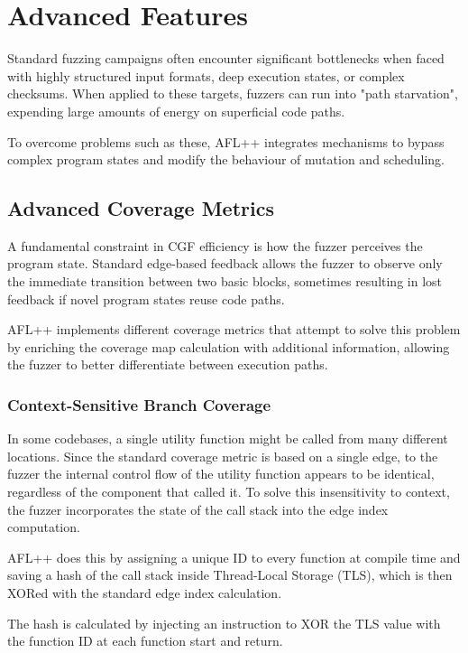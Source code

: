 \section{Advanced Features}

Standard fuzzing campaigns often encounter significant bottlenecks when faced with highly structured input formats, deep execution states, or complex checksums. When applied to these targets, fuzzers can run into "path starvation", expending large amounts of energy on superficial code paths.

To overcome problems such as these, AFL++ integrates mechanisms to bypass complex program states and modify the behaviour of mutation and scheduling.

\subsection{Advanced Coverage Metrics}

A fundamental constraint in CGF efficiency is how the fuzzer perceives the program state. Standard edge-based feedback allows the fuzzer to observe only the immediate transition between two basic blocks, sometimes resulting in lost feedback if novel program states reuse code paths.

AFL++ implements different coverage metrics that attempt to solve this problem by enriching the coverage map calculation with additional information, allowing the fuzzer to better differentiate between execution paths.

\subsubsection{Context-Sensitive Branch Coverage}

In some codebases, a single utility function might be called from many different locations. Since the standard coverage metric is based on a single edge, to the fuzzer the internal control flow of the utility function appears to be identical, regardless of the component that called it. To solve this insensitivity to context, the fuzzer incorporates the state of the call stack into the edge index computation. 

AFL++ does this by assigning a unique ID to every function at compile time and saving a hash of the call stack inside Thread-Local Storage (TLS), which is then XORed with the standard edge index calculation. 

The hash is calculated by injecting an instruction to XOR the TLS value with the function ID at each function start and return.

